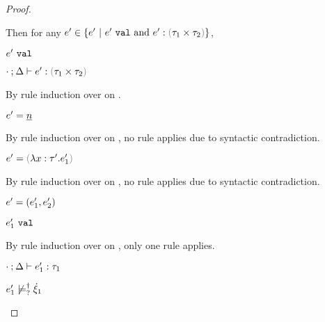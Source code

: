 \begin{proof}
\begin{byCases}
\begin{byCases}
\begin{byCases}
        Then for any $e' \in \{e' ~\vert~ \isVal{e'} \textand e' : \tprod{\tau_1}{\tau_2}\}$,
        \begin{pfsteps*}
        \item $e' ~\mathtt{val}$  
        \item $\hexptyp{\cdot}{\Delta}{e'}{\tprod{\tau_1}{\tau_2}}$  
        \end{pfsteps*}
        By rule induction over  on .
        \begin{byCases}
          \item[\text{(\ref{rule:VNum})}]
          \begin{pfsteps*}
          \item $e'=\underline{n}$ 
          \end{pfsteps*} 
          By rule induction over  on , no rule applies due to syntactic contradiction.
          \item[\text{(\ref{rule:VLam})}]
          \begin{pfsteps*} 
          \item $e'=\hlam{x}{\tau'}{e_1'}$ 
          \end{pfsteps*}
          By rule induction over  on , no rule applies due to syntactic contradiction.
          \item[\text{(\ref{rule:VPair})}] 
          \begin{pfsteps*} 
          \item $e'=(e_1' , e_2')$ 
          \item $e_1' ~\mathtt{val}$  
          \end{pfsteps*}
          By rule induction over  on , only one rule applies.
          \begin{byCases}
            \item[\text{(\ref{rule:TPair})}]
            \begin{pfsteps*}
            \item $\cdot \mathbin{;} \Delta \vdash e_1' : \tau_1$  
            \item $e_1' \not\models_{?}^{\dag} \dot{\xi}_1$  

\end{pfsteps*}
\end{byCases}
\end{byCases}
\end{byCases}
\end{byCases}
\end{byCases}
\end{proof}
